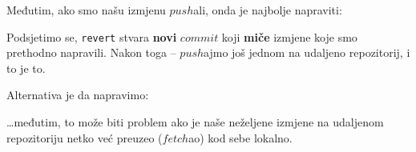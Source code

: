 Međutim, ako smo našu izmjenu $push$ali, onda je najbolje napraviti:


Podsjetimo se, \verb+revert+ stvara \textbf{novi} $commit$ koji \textbf{miče} izmjene koje smo prethodno napravili.
Nakon toga -- $push$ajmo još jednom na udaljeno repozitorij, i to je to.

Alternativa je da napravimo:


\dots{}međutim, to može biti problem ako je naše neželjene izmjene na udaljenom repozitoriju netko već preuzeo ($fetch$ao) kod sebe lokalno.
